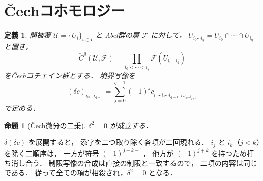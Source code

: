 \documentclass[a5paper,10pt,onecolumn]{jsarticle}
\makeatletter
\theoremstyle{mathnotetheorem}
\newtheorem{definition}[theorem]{定義}
\newtheorem{proposition}[theorem]{命題}
\renewcommand{\proofname}{証明}
\renewenvironment{proof}[1][\proofname]{%
  \par\pushQED{\qed}\normalfont\topsep4\p@\@plus2\p@\relax
  \trivlist\item[\hskip\labelsep\bfseries #1]\ignorespaces
}{\popQED\endtrivlist\@endpefalse}
\makeatother
\begin{document}
\section{\v Cechコホモロジー}

\begin{definition}
開被覆 $\mathcal U=\{U_i\}_{i\in I}$ と
Abel群の層 $\mathcal F$ に対して，
$U_{i_0\cdots i_q}=U_{i_0}\cap\cdots\cap U_{i_q}$ と置き，
\[
 \check C^q(\mathcal U,\mathcal F)
 =\prod_{i_0<\cdots<i_q}
 \mathcal F(U_{i_0\cdots i_q})
\]
を\v Cechコチェイン群とする．
境界写像を
\[
 (\delta c)_{i_0\cdots i_{q+1}}
 =\sum_{j=0}^{q+1}(-1)^j
 c_{i_0\cdots\widehat{i_j}\cdots i_{q+1}}
 \big|_{U_{i_0\cdots i_{q+1}}}
\]
で定める．
\end{definition}

\begin{proposition}[\v Cech微分の二乗]\label{prop:cech-d2}
$\delta^2=0$ が成立する．
\end{proposition}
\begin{proof}
$\delta(\delta c)$ を展開すると，
添字を二つ取り除く各項が二回現れる．
$i_j$ と $i_k$（$j<k$）を除く二順序は，
一方が符号 $(-1)^{j+k-1}$，
他方が $(-1)^{j+k}$ を持つため打ち消し合う．
制限写像の合成は直接の制限と一致するので，
二項の内容は同じである．
従って全ての項が相殺され，$\delta^2=0$ となる．
\end{proof}
\end{document}
